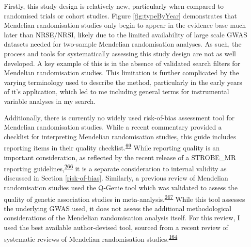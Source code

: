 \documentclass[a4paper, twoside]{templates/ociamthesis}
\begin{document}
Firstly, this study design is relatively new, particularly when compared to randomised trials or cohort studies. Figure \ref{fig:typeByYear} demonstrates that Mendelian randomisation studies only begin to appear in the evidence base much later than NRSE/NRSI, likely due to the limited availability of large scale GWAS datasets needed for two-sample Mendelian randomisation analyses. As such, the process and tools for systematically assessing this study design are not as well developed. A key example of this is in the absence of validated search filters for Mendelian randomisation studies. This limitation is further complicated by the varying terminology used to describe the method, particularly in the early years of it's application, which led to me including general terms for instrumental variable analyses in my search.

Additionally, there is currently no widely used risk-of-bias assessment tool for Mendelian randomisation studies. While a recent commentary provided a checklist for interpreting Mendelian randomisation studies, this guide includes reporting items in their quality checklist.\textsuperscript{\protect\hyperlink{ref-davies2018}{69}} While reporting quality is an important consideration, as reflected by the recent release of a STROBE\_MR reporting guidelines,\textsuperscript{\protect\hyperlink{ref-skrivankova2021}{266}} it is a separate consideration to internal validity as discussed in Section \ref{risk-of-bias}. Similarly, a previous review of Mendelian randomisation studies used the Q-Genie tool which was validated to assess the quality of genetic association studies in meta-analysis.\textsuperscript{\protect\hyperlink{ref-sohani2015}{267}} While this tool assesses the underlying GWAS used, it does not assess the additional methodological considerations of the Mendelian randomisation analysis itself. For this review, I used the best available author-devised tool, sourced from a recent review of systematic reviews of Mendelian randomisation studies.\textsuperscript{\protect\hyperlink{ref-spiga2021}{164}}
\end{document}
